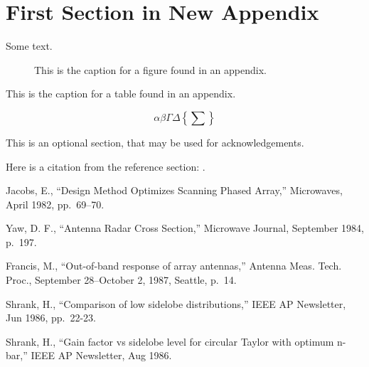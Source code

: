 \section{First Section in New Appendix}
Some text.


\begin{figure}[h]
\caption{This is the caption for a figure found in
an appendix.}
\end{figure}


\begin{table}[h]
\caption{This is the caption for a table found in
an appendix.}
\end{table}

\begin{equation}
\alpha\beta\Gamma\Delta\left\{\sum\right\}\end{equation}


\acks
This is an optional section, that may be used for acknowledgements.


Here is a citation from the reference section: \cite{jacobs}.



Jacobs, E., ``Design Method Optimizes Scanning
Phased Array,'' Microwaves, April 1982, pp.\ 69--70.

Yaw, D. F., ``Antenna Radar Cross Section,'' Microwave
Journal, September 1984, p.\ 197.

 Francis, M., ``Out-of-band response of array antennas,''
Antenna Meas.  Tech. Proc., September 28--October 2, 1987, Seattle, p.~14.

 Shrank, H., ``Comparison of low sidelobe 
distributions,'' IEEE AP
Newsletter, Jun 1986, pp.~22-23.

 Shrank, H., ``Gain factor vs 
sidelobe level for circular Taylor
with optimum n-bar,'' IEEE AP Newsletter, Aug 1986.

\endreferences










